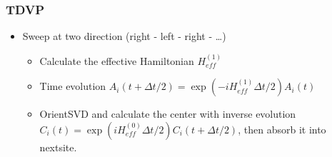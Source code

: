 \documentclass{beamer}
\begin{document}
\begin{frame}
	\frametitle{TDVP}
	\begin{itemize}
		\item Sweep at two direction (right - left - right - \dots)
		\begin{itemize}
			\item Calculate the effective Hamiltonian $H_{eff}^{(1)}$
			\item Time evolution $A_i(t+\Delta t/2) = \exp(-iH_{eff}^{(1)}\Delta t / 2)A_i(t)$ 
			\item OrientSVD and calculate the center with inverse evolution $C_i(t) = \exp(iH_{eff}^{(0)}\Delta t /2) C_i(t+\Delta t/2)$, then absorb it into nextsite.
			\setcounter{subfigure}{0}
			\begin{figure}[H]
				\centering
				\subfigbottomskip=2pt
				\subfigcapskip=-5pt
			\end{figure}
		\end{itemize}
	\end{itemize}
\end{frame}
\end{document}
